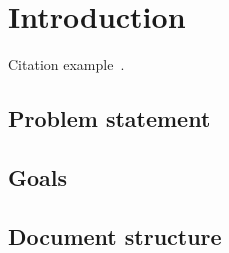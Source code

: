 \section{Introduction}
Citation example~\autocite{FooAuthor}.
\subsection{Problem statement}

\lipsum[10-12]

\subsection{Goals}

\lipsum[5-8]

\subsection{Document structure}

\lipsum[12-16]
